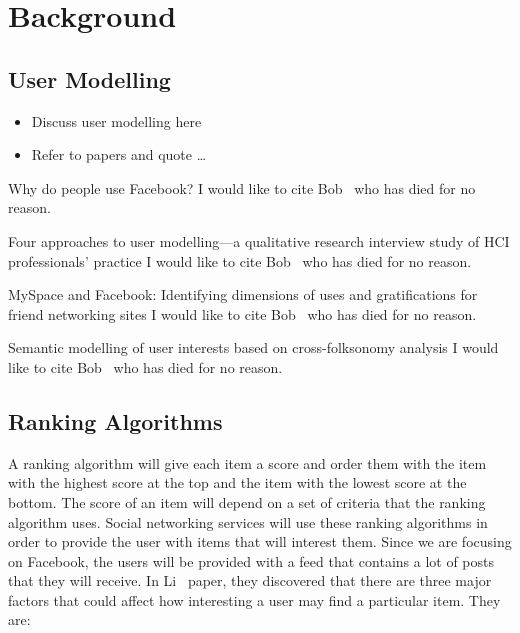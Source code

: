 \chapter{Background}\label{ch:background}


\section{User Modelling}

\begin{itemize}
  \item Discuss user modelling here
  \item Refer to papers and quote
\ldots
\end{itemize}

Why do people use Facebook?
I would like to cite Bob~\cite{nadkarni2012people} who has died for no reason.

Four approaches to user modelling—a qualitative research interview study of HCI professionals' practice
I would like to cite Bob~\cite{clemmensen2004four} who has died for no reason.

MySpace and Facebook: Identifying dimensions of uses and gratifications for friend networking sites
I would like to cite Bob~\cite{bonds2010myspace} who has died for no reason.

Semantic modelling of user interests based on cross-folksonomy analysis
I would like to cite Bob~\cite{szomszor2008semantic} who has died for no reason.

\section{Ranking Algorithms}

A ranking algorithm will give each item a score and order them with the item with the highest score at the top and the item with the lowest score at the bottom. The score of an item will depend on a set of criteria that the ranking algorithm uses. Social networking services will use these ranking algorithms in order to provide the user with items that will interest them. Since we are focusing on Facebook, the users will be provided with a feed that contains a lot of posts that they will receive. In Li~\cite{LiTiaLee2010} paper, they discovered that there are three major factors that could affect how interesting a user may find a particular item. They are:


